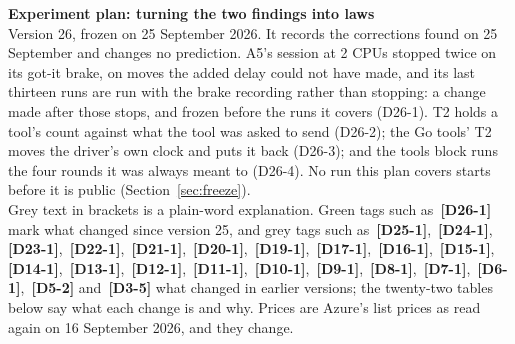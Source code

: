 \documentclass[11pt]{article}
\newcommand{\chg}[1]{\,{\color{chgcol}\bfseries\footnotesize[#1]}}
\newcommand{\chgold}[1]{\,{\color{oldcol}\bfseries\footnotesize[#1]}}
\begin{document}
{\LARGE\bfseries Experiment plan: turning the two findings into laws}\\[3pt]
{\large Version 26, frozen on 25 September 2026. It records the corrections found on 25 September and changes no prediction. A5's session at 2 CPUs stopped twice on its got-it brake, on moves the added delay could not have made, and its last thirteen runs are run with the brake recording rather than stopping: a change made after those stops, and frozen before the runs it covers (D26-1). T2 holds a tool's count against what the tool was asked to send (D26-2); the Go tools' T2 moves the driver's own clock and puts it back (D26-3); and the tools block runs the four rounds it was always meant to (D26-4). No run this plan covers starts before it is public (Section~\ref{sec:freeze}).}\\[2pt]
{\color{soft}\small Grey text in brackets is a plain-word explanation. Green tags such as \chg{D26-1} mark what changed since version 25, and grey tags such as \chgold{D25-1}, \chgold{D24-1}, \chgold{D23-1}, \chgold{D22-1}, \chgold{D21-1}, \chgold{D20-1}, \chgold{D19-1}, \chgold{D17-1}, \chgold{D16-1}, \chgold{D15-1}, \chgold{D14-1}, \chgold{D13-1}, \chgold{D12-1}, \chgold{D11-1}, \chgold{D10-1}, \chgold{D9-1}, \chgold{D8-1}, \chgold{D7-1}, \chgold{D6-1}, \chgold{D5-2} and \chgold{D3-5} what changed in earlier versions; the twenty-two tables below say what each change is and why. Prices are Azure's list prices as read again on 16 September 2026, and they change.}
\end{document}
